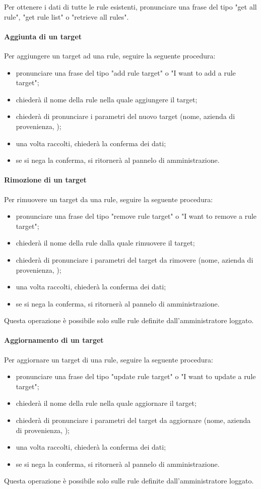 Per ottenere i dati di tutte le rule esistenti, pronunciare una frase del tipo "get all rule", "get rule list" o "retrieve all rules".
\paragraph{Aggiunta di un target}\label{addRuleTarget}
Per aggiungere un target ad una rule, seguire la seguente procedura:
\begin{itemize}
	\item pronunciare una frase del tipo "add rule target" o "I want to add a rule target";
	\item \PROGETTO{} chiederà il nome della rule nella quale aggiungere il target;
	\item \PROGETTO{} chiederà di pronunciare i parametri del nuovo target (nome, azienda di provenienza, );
	\item una volta raccolti, \PROGETTO{} chiederà la conferma dei dati;
	\item se si nega la conferma, si ritornerà al pannelo di amministrazione.
\end{itemize}
\paragraph{Rimozione di un target}
Per rimuovere un target da una rule, seguire la seguente procedura:
\begin{itemize}
	\item pronunciare una frase del tipo "remove rule target" o "I want to remove a rule target";
	\item \PROGETTO{} chiederà il nome della rule dalla quale rimuovere il target;
	\item \PROGETTO{} chiederà di pronunciare i parametri del target da rimovere (nome, azienda di provenienza, );
	\item una volta raccolti, \PROGETTO{} chiederà la conferma dei dati;
	\item se si nega la conferma, si ritornerà al pannelo di amministrazione.
\end{itemize}
Questa operazione è possibile solo sulle rule definite dall'amministratore loggato.
\paragraph{Aggiornamento di un target}\label{updateRuleTarget}
Per aggiornare un target di una rule, seguire la seguente procedura:
\begin{itemize}
	\item pronunciare una frase del tipo "update rule target" o "I want to update a rule target";
	\item \PROGETTO{} chiederà il nome della rule nella quale aggiornare il target;
	\item \PROGETTO{} chiederà di pronunciare i parametri del target da aggiornare (nome, azienda di provenienza, );
	\item una volta raccolti, \PROGETTO{} chiederà la conferma dei dati;
	\item se si nega la conferma, si ritornerà al pannelo di amministrazione.
\end{itemize}
Questa operazione è possibile solo sulle rule definite dall'amministratore loggato.
